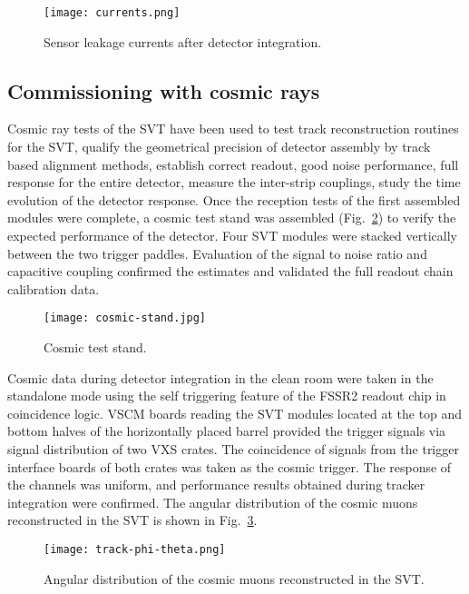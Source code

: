 \begin{figure}[hbt] 
\centering 
\texttt{[image: currents.png]}
\caption{Sensor leakage currents after detector integration.}
\label{fig:currents}
\end{figure}

\subsection{Commissioning with cosmic rays}

Cosmic ray tests of the SVT have been used to test track reconstruction routines for the SVT, qualify the geometrical precision of detector assembly by track based alignment methods, establish correct readout, good noise performance, full response for the entire detector, measure the inter-strip couplings, study the time evolution of the detector response. 
Once the reception tests of the first assembled modules were complete, a cosmic test stand was assembled (Fig.~\ref{fig:cosmic-stand}) to verify the expected performance of the detector. Four SVT modules were stacked vertically between the two trigger paddles. Evaluation of the signal to noise ratio and capacitive coupling confirmed the estimates and validated the full readout chain calibration data.

\begin{figure}[hbt] 
\centering 
\texttt{[image: cosmic-stand.jpg]}
\caption{Cosmic test stand.}
\label{fig:cosmic-stand}
\end{figure}

Cosmic data during detector integration in the clean room were taken in the standalone mode using the self triggering feature of the FSSR2 readout chip in coincidence logic. VSCM boards reading the SVT modules located at the top and bottom halves of the horizontally placed barrel provided the trigger signals via signal distribution of two VXS crates. The coincidence of  signals from the trigger interface boards of both crates was taken as the cosmic trigger. The response of the channels was uniform, and performance results obtained during tracker integration were confirmed. The angular distribution of the cosmic muons reconstructed in the SVT is shown in Fig.~\ref{fig:track-phi-theta}.

\begin{figure}[hbt] 
\centering 
\texttt{[image: track-phi-theta.png]}
\caption{Angular distribution of the cosmic muons reconstructed in the SVT.}
\label{fig:track-phi-theta}
\end{figure}

